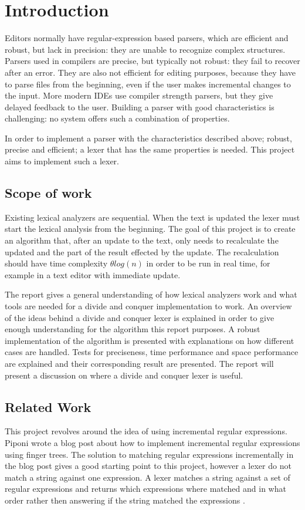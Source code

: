 \chapter{Introduction}
Editors normally have regular-expression based parsers, which are efficient and
robust, but lack in precision: they are unable to recognize complex structures.
Parsers used in compilers are precise, but typically not robust: they fail to
recover after an error. They are also not efficient for editing purposes,
because they have to parse files from the beginning, even if the user makes
incremental changes to the input. More modern IDEs use compiler strength
parsers, but they give delayed feedback to the user. Building a parser with good
characteristics is challenging: no system offers such a combination of
properties.

In order to implement a parser with the characteristics described above; robust,
precise and efficient; a lexer that has the same properties is needed. This
project aims to implement such a lexer.

\section{Scope of work}
Existing lexical analyzers are sequential. When the text is updated the lexer
must start the lexical analysis from the beginning. The goal of this project is
to create an algorithm that, after an update to the text, only needs to
recalculate the updated and the part of the result effected by the update. The
recalculation should have time complexity $\theta log(n)$ in order to be run in
real time, for example in a text editor with immediate update.

The report gives a general understanding of how lexical analyzers work and what
tools are needed for a divide and conquer implementation to work. An overview of
the ideas behind a divide and conquer lexer is explained in order to give enough
understanding for the algorithm this report purposes. A robust implementation of
the algorithm is presented with explanations on how different cases are handled.
Tests for preciseness, time performance and space performance are explained and
their corresponding result are presented. The report will present a discussion
on where a divide and conquer lexer is useful.

\section{Related Work}
This project revolves around the idea of using incremental regular expressions.
Piponi \cite{blog} wrote a blog post about how to implement incremental regular expressions
using finger trees. The solution to matching
regular expressions incrementally in the blog post gives a good starting point to
this project, however a lexer do not match a string against one expression. A
lexer matches a string against a set of regular expressions and returns which
expressions where matched and in what order rather then answering if the string
matched the expressions \cite{blog}.

